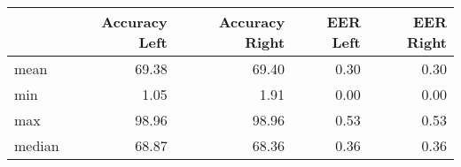 \begin{tabular}{lrrrr}
\toprule
{} &  Accuracy Left &  Accuracy Right &  EER Left &  EER Right \\
\midrule
mean   &          69.38 &           69.40 &      0.30 &       0.30 \\
min    &           1.05 &            1.91 &      0.00 &       0.00 \\
max    &          98.96 &           98.96 &      0.53 &       0.53 \\
median &          68.87 &           68.36 &      0.36 &       0.36 \\
\bottomrule
\end{tabular}
